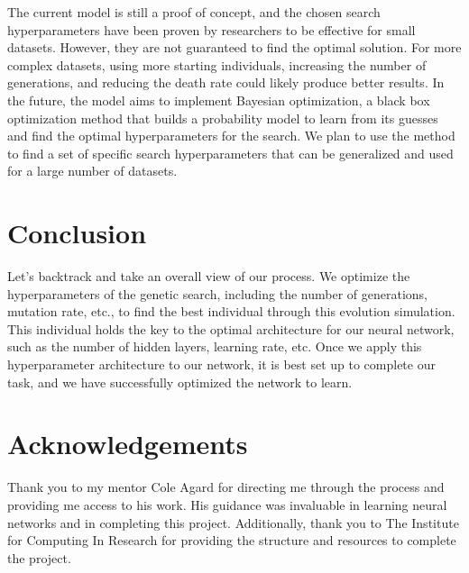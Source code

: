 The current model is still a proof of concept, and the chosen search hyperparameters have been proven by researchers to be effective for small datasets. However, they are not guaranteed to find the optimal solution. For more complex datasets, using more starting individuals, increasing the number of generations, and reducing the death rate could likely produce better results. In the future, the model aims to implement Bayesian optimization, a black box optimization method that builds a probability model to learn from its guesses and find the optimal hyperparameters for the search. We plan to use the method to find a set of specific search hyperparameters that can be generalized and used for a large number of datasets.


\vspace{10pt}
\section{Conclusion}

Let's backtrack and take an overall view of our process. We optimize the hyperparameters of the genetic search, including the number of generations, mutation rate, etc., to find the best individual through this evolution simulation. This individual holds the key to the optimal architecture for our neural network, such as the number of hidden layers, learning rate, etc. Once we apply this hyperparameter architecture to our network, it is best set up to complete our task, and we have successfully optimized the network to learn.

\vspace{10pt}
\section{Acknowledgements}


Thank you to my mentor Cole Agard for directing me through the process and providing me access to his work. His guidance was invaluable in learning neural networks and in completing this project. Additionally, thank you to The Institute for Computing In Research for providing the structure and resources to complete the project. 






\nocite{*}









